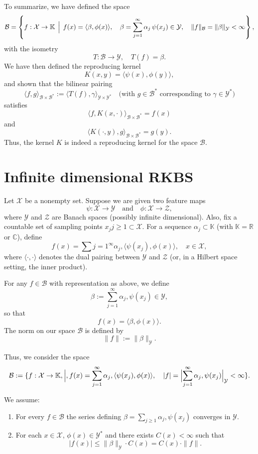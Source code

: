 To summarize, we have defined the space
\[
\mathcal{B} = \left\{ f:\mathcal{X}\to \mathbb{K}\,\Bigm|\, f(x)= \langle \beta, \phi(x)\rangle,\quad \beta= \sum_{j=1}^\infty \alpha_j\,\psi(x_j)\in\mathcal{Y},\quad \|f\|_{\mathcal{B}}=\|\beta\|_{\mathcal{Y}} < \infty \right\},
\]
with the isometry
\[
T:\mathcal{B}\to \mathcal{Y},\quad T(f)=\beta.
\]
We have then defined the reproducing kernel
\[
K(x,y)=\langle \psi(x), \phi(y)\rangle,
\]
and shown that the bilinear pairing
\[
\langle f, g \rangle_{\mathcal{B}\times \mathcal{B}^*} := \langle T(f), \gamma\rangle_{\mathcal{Y}\times \mathcal{Y}^*} \quad \text{(with } g\in \mathcal{B}^* \text{ corresponding to } \gamma\in \mathcal{Y}^*\text{)}
\]
satisfies
\[
\langle f, K(x,\cdot) \rangle_{\mathcal{B}\times \mathcal{B}^*} = f(x)
\]
and
\[
\langle K(\cdot,y), g \rangle_{\mathcal{B}\times \mathcal{B}^*} = g(y).
\]
Thus, the kernel \(K\) is indeed a reproducing kernel for the space \(\mathcal{B}\).

\newpage


\section{Infinite dimensional RKBS}
Let $\mathcal{X}$ be a nonempty set. Suppose we are given two feature maps
\[
\psi:\mathcal{X}\to \mathcal{Y} \quad \text{and} \quad \phi:\mathcal{X}\to \mathcal{Z},
\]
where $\mathcal{Y}$ and $\mathcal{Z}$ are Banach spaces (possibly infinite dimensional). Also, fix a countable set of sampling points ${x_j}{j\ge1}\subset \mathcal{X}$. For a sequence ${\alpha_j}\subset \mathbb{K}$ (with $\mathbb{K}=\mathbb{R}$ or $\mathbb{C}$), define
\[
f(x)= \sum{j=1}^\infty \alpha_j, \langle \psi(x_j), \phi(x)\rangle, \quad x\in \mathcal{X},
\]
where $\langle \cdot,\cdot\rangle$ denotes the dual pairing between $\mathcal{Y}$ and $\mathcal{Z}$ (or, in a Hilbert space setting, the inner product).
\begin{definition}
For any $f \in \mathcal{B}$ with representation as above, we define
\[
\beta := \sum_{j=1}^\infty \alpha_j, \psi(x_j)\in \mathcal{Y},
\]
so that
\[
f(x)= \langle \beta, \phi(x) \rangle.
\]
The norm on our space $\mathcal{B}$ is defined by
\[
\|f\| := \|\beta\|_{\mathcal{Y}}.
\]
\end{definition}
Thus, we consider the space
\begin{align*}
    \mathcal{B} := \{ f:\mathcal{X}\to \mathbb{K},\Bigm|, f(x)= \sum_{j=1}^\infty \alpha_j, \langle \psi(x_j), \phi(x)\rangle,\quad |f| = \Bigl|\sum_{j=1}^\infty \alpha_j, \psi(x_j)\Bigr|_{\mathcal{Y}} < \infty \}.
\end{align*}
\begin{definition}
We assume:
\begin{enumerate}
\item For every $f\in\mathcal{B}$ the series defining $\beta=\sum_{j\ge1}\alpha_j, \psi(x_j)$ converges in $\mathcal{Y}$.
\item For each $x\in\mathcal{X}$, $\phi(x)\in \mathcal{Y}^*$ and there exists $C(x)<\infty$ such that
\[
|f(x)| \le \|\beta\|_{\mathcal{Y}} \cdot C(x) = C(x)\cdot \|f\|.
\]
\end{enumerate}
\end{definition}
